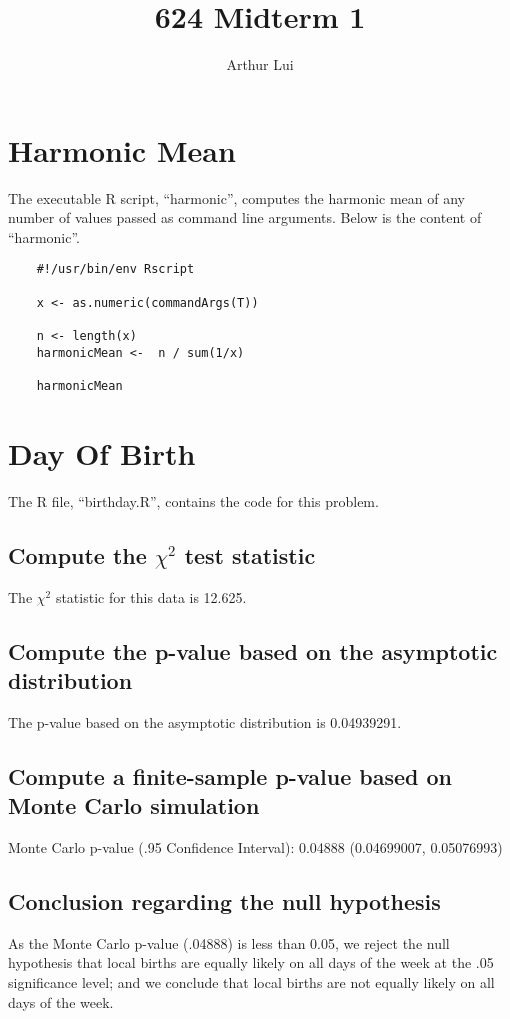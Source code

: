 \documentclass{article}
\author{Arthur Lui}
\title{624 Midterm 1}
\begin{document}
\maketitle

\section{Harmonic Mean}
  The executable R script, ``harmonic'', computes the 
  harmonic mean of any number of values passed as command 
  line arguments. Below is the content of ``harmonic''.

  \begin{verbatim}
    #!/usr/bin/env Rscript

    x <- as.numeric(commandArgs(T))

    n <- length(x)
    harmonicMean <-  n / sum(1/x)

    harmonicMean
  \end{verbatim}

\section{Day Of Birth}
  The R file, ``birthday.R'', contains the code for this problem.
  \subsection{Compute the $\chi^2$ test statistic}
  The $\chi^2$ statistic for this data is 12.625.
  \subsection{Compute the p-value based on the asymptotic distribution}
  The p-value based on the asymptotic distribution is 0.04939291.
  \subsection{Compute a finite-sample p-value based on Monte Carlo simulation}
  Monte Carlo p-value (.95 Confidence Interval): 0.04888 (0.04699007, 0.05076993)
  \subsection{Conclusion regarding the null hypothesis}
  As the Monte Carlo p-value (.04888) is less than 0.05, 
  we reject the null hypothesis that local births are 
  equally likely on all days of the week at the .05 
  significance level; and we conclude that local births 
  are not equally likely on all days of the week. 
\end{document}
